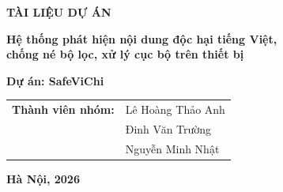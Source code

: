 \documentclass[12pt,a4paper]{article}
\begin{document}
\begin{titlepage}
    \centering
    \vspace*{3cm}
    
    {\LARGE \textbf{TÀI LIỆU DỰ ÁN}\par}
    \vspace{1.5cm}
    
    {\Large \textbf{Hệ thống phát hiện nội dung độc hại tiếng Việt,\\ chống né bộ lọc, xử lý cục bộ trên thiết bị}\par}
    
    \vspace{3cm}
    {\large \textbf{Dự án: SafeViChi}\par}
    \vspace{1.5cm}
    
    \begin{center}
        \begin{tabular}{l l}
            \textbf{Thành viên nhóm:} & Lê Hoàng Thảo Anh \\[0.2cm]
                                      & Đinh Văn Trường \\[0.2cm]
                                      & Nguyễn Minh Nhật \\
        \end{tabular}
    \end{center}
    
    \vspace{2cm}
    {\normalsize \textbf{Hà Nội, 2026}\par}
    
    \vfill
\end{titlepage}

\newpage
\tableofcontents

\newpage
\end{document}
